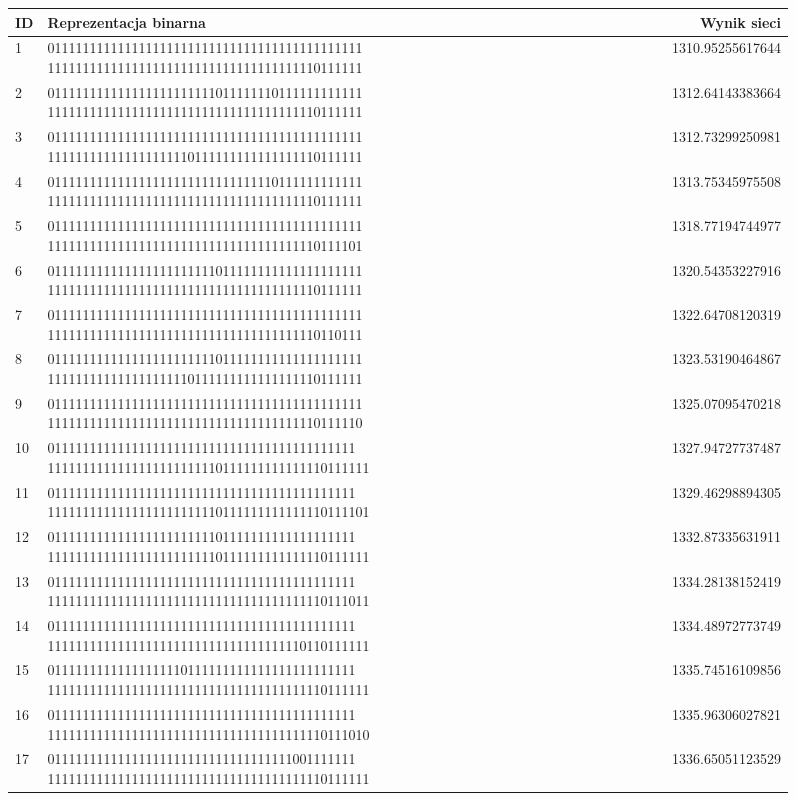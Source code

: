 \documentclass[twoside,12pt]{report}
\begin{document}
\begin{figure}[htbp]
\centering
{}
\label{tab:tabela_wynikow} 
\begin{tabularx}{\linewidth}{ | l | X | r | }
	\hline
	ID & Reprezentacja binarna & Wynik sieci \\
	\hline
	1 & 011111111111111111111111111111111111111111111 111111111111111111111111111111111111110111111 & 1310.95255617644 \\ \hline
	2 & 011111111111111111111111011111110111111111111 111111111111111111111111111111111111110111111 & 1312.64143383664 \\ \hline
	3 & 011111111111111111111111111111111111111111111 111111111111111111110111111111111111110111111 & 1312.73299250981 \\ \hline
	4 & 011111111111111111111111111111110111111111111 111111111111111111111111111111111111110111111 & 1313.75345975508 \\ \hline
	5 & 011111111111111111111111111111111111111111111 111111111111111111111111111111111111110111101 & 1318.77194744977 \\ \hline
	6 & 011111111111111111111111011111111111111111111 111111111111111111111111111111111111110111111 & 1320.54353227916 \\ \hline
	7 & 011111111111111111111111111111111111111111111 111111111111111111111111111111111111110110111 & 1322.64708120319 \\ \hline
	8 & 011111111111111111111111011111111111111111111 111111111111111111110111111111111111110111111 & 1323.53190464867 \\ \hline
	9 & 011111111111111111111111111111111111111111111 111111111111111111111111111111111111110111110 & 1325.07095470218 \\ \hline
	10 & 01111111111111111111111111111111111111111111 1111111111111111111111110111111111111110111111 & 1327.94727737487 \\ \hline
	11 & 01111111111111111111111111111111111111111111 1111111111111111111111110111111111111110111101 & 1329.46298894305 \\ \hline
	12 & 01111111111111111111111101111111111111111111 1111111111111111111111110111111111111110111111 & 1332.87335631911 \\ \hline
	13 & 01111111111111111111111111111111111111111111 1111111111111111111111111111111111111110111011 & 1334.28138152419 \\ \hline
	14 & 01111111111111111111111111111111111111111111 1111111111111111111111111111111111110110111111 & 1334.48972773749 \\ \hline
	15 & 01111111111111111110111111111111111111111111 1111111111111111111111111111111111111110111111 & 1335.74516109856 \\ \hline
	16 & 01111111111111111111111111111111111111111111 1111111111111111111111111111111111111110111010 & 1335.96306027821 \\ \hline
	17 & 01111111111111111111111111111111111001111111 1111111111111111111111111111111111111110111111 & 1336.65051123529 \\ \hline
\end{tabularx}
\end{figure}%
\clearpage
\end{document}
